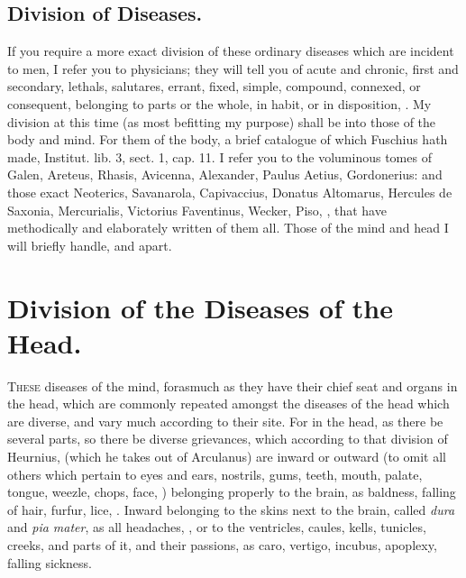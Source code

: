 {\subsection{Division of Diseases.}
If you require a more exact division of these
ordinary diseases which are incident to men, I refer you to physicians;
they will tell you of acute and chronic, first and secondary,
lethals, salutares, errant, fixed, simple, compound, connexed, or
consequent, belonging to parts or the whole, in habit, or in
disposition, \etc{}. My division at this time (as most befitting my
purpose) shall be into those of the body and mind. For them of the
body, a brief catalogue of which Fuschius hath made, Institut. lib. 3,
sect. 1, cap. 11. I refer you to the voluminous tomes of Galen,
Areteus, Rhasis, Avicenna, Alexander, Paulus Aetius, Gordonerius: and
those exact Neoterics, Savanarola, Capivaccius, Donatus Altomarus,
Hercules de Saxonia, Mercurialis, Victorius Faventinus, Wecker, Piso,
\etc{}, that have methodically and elaborately written of them all. Those
of the mind and head I will briefly handle, and apart.

\section{Division of the Diseases of the Head.}

\lettrine{T}{hese} diseases of the mind, forasmuch as they have their chief seat and
organs in the head, which are commonly repeated amongst the diseases of
the head which are diverse, and vary much according to their site. For
in the head, as there be several parts, so there be diverse grievances,
which according to that division of Heurnius, (which he takes out
of Arculanus) are inward or outward (to omit all others which pertain
to eyes and ears, nostrils, gums, teeth, mouth, palate, tongue, weezle,
chops, face, \etc{}) belonging properly to the brain, as baldness, falling
of hair, furfur, lice, \etc{}. Inward belonging to the skins next to
the brain, called \emph{dura} and \emph{pia mater}, as all headaches, \etc{}, or to
the ventricles, caules, kells, tunicles, creeks, and parts of it, and
their passions, as caro, vertigo, incubus, apoplexy, falling sickness.

}
